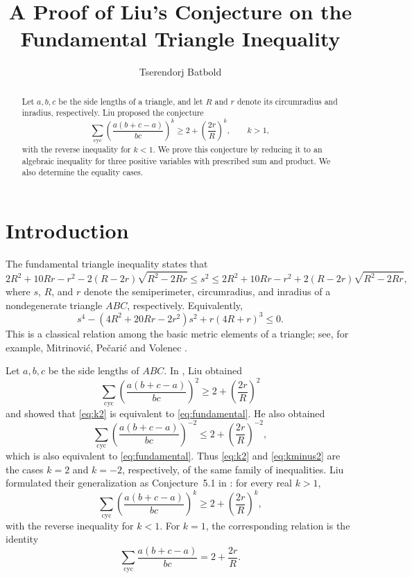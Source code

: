 \documentclass[11pt]{amsart}
\title{A Proof of Liu's Conjecture on the Fundamental Triangle Inequality}
\author{Tserendorj Batbold}
\theoremstyle{remark}
\newcommand{\cyc}{\sum_{\mathrm{cyc}}}
\begin{document}

\maketitle

\begin{abstract}
Let $a,b,c$ be the side lengths of a triangle, and let $R$ and $r$
denote its circumradius and inradius, respectively. Liu proposed the
conjecture
\[
 \cyc \left(\frac{a(b+c-a)}{bc}\right)^k
 \ge 2+\left(\frac{2r}{R}\right)^k,\qquad k>1,
\]
with the reverse inequality for $k<1$. We prove this conjecture by
reducing it to an algebraic inequality for three positive variables
with prescribed sum and product. We also determine the equality cases.
\end{abstract}



\section{Introduction}

The fundamental triangle inequality states that
\[
2R^2+10Rr-r^2-2(R-2r)\sqrt{R^2-2Rr}
\le s^2
\le
2R^2+10Rr-r^2+2(R-2r)\sqrt{R^2-2Rr},
\]
where $s$, $R$, and $r$ denote the semiperimeter, circumradius, and
inradius of a nondegenerate triangle $ABC$, respectively. Equivalently,
\begin{equation}\label{eq:fundamental}
 s^4-(4R^2+20Rr-2r^2)s^2+r(4R+r)^3\le0.
\end{equation}
This is a classical relation among the basic metric elements of a
triangle; see, for example, Mitrinovi\'c, Pe\v{c}ari\'c and Volenec
\cite{Mitrinovic1989}.

Let $a,b,c$ be the side lengths of $ABC$. In \cite{Liu2022}, Liu
obtained
\begin{equation}\label{eq:k2}
 \cyc \left(\frac{a(b+c-a)}{bc}\right)^2
 \ge 2+\left(\frac{2r}{R}\right)^2
\end{equation}
and showed that \eqref{eq:k2} is equivalent to
\eqref{eq:fundamental}. He also obtained
\begin{equation}\label{eq:kminus2}
 \cyc \left(\frac{a(b+c-a)}{bc}\right)^{-2}
 \le 2+\left(\frac{2r}{R}\right)^{-2},
\end{equation}
which is also equivalent to \eqref{eq:fundamental}. Thus
\eqref{eq:k2} and \eqref{eq:kminus2} are the cases $k=2$ and $k=-2$,
respectively, of the same family of inequalities. Liu formulated their
generalization as Conjecture~5.1 in \cite{Liu2022}: for every real
$k>1$,
\begin{equation}\label{eq:liu}
 \cyc \left(\frac{a(b+c-a)}{bc}\right)^k
 \ge 2+\left(\frac{2r}{R}\right)^k,
\end{equation}
with the reverse inequality for $k<1$. For $k=1$, the corresponding
relation is the identity
\begin{equation}\label{eq:k1}
 \cyc \frac{a(b+c-a)}{bc}
 =2+\frac{2r}{R}.
\end{equation}
\end{document}
